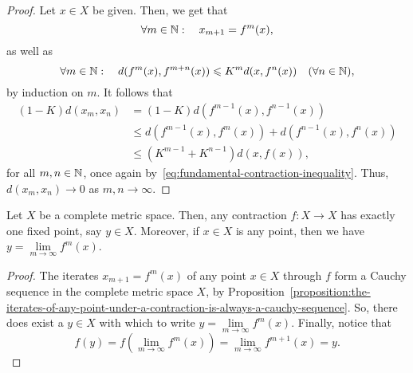 \begin{proof}
  Let \(x\in{X}\) be given. Then, we get that
  \[
    \forall{m}\in\mathbb{N}:
    \quad{x_{m+1}=f^{m}(x)},
  \]
  as well as
  \[
    \forall{m}\in\mathbb{N}:
    \quad{d(f^{m}(x),f^{m+n}(x))\leqslant{K^{m}}d(x,f^{n}(x))}
    \quad{(\forall{n}\in\mathbb{N})},
  \]
  by induction on \(m\). It follows that
  \begin{equation}
    \begin{split}
      (1-K)d(x_{m},x_{n})
      &=
      (1-K)d(f^{m-1}(x),f^{n-1}(x))
      \\
      &\leqslant{d(f^{m-1}(x),f^{m}(x))+d(f^{n-1}(x),f^{n}(x))}
      \\
      &\leqslant{\left(K^{m-1}+K^{n-1}\right)d(x,f(x))},
    \end{split}
  \end{equation}
  for all \(m,n\in\mathbb{N}\), once again
  by~\eqref{eq:fundamental-contraction-inequality}. Thus,
  \(d(x_{m},x_{n})\to{0}\) as \(m,n\to\infty\).
\end{proof}

\begin{corollary}\label{corollary:banachs-contraction-principle}
  Let \(X\) be a complete metric space. Then, any contraction \(f:X\to{X}\) has
  exactly one fixed point, say \(y\in{X}\). Moreover, if \(x\in{X}\) is any
  point, then we have \(y=\lim\limits_{m\to\infty}f^{m}(x)\).
\end{corollary}

\begin{proof}
  The iterates \(x_{m+1}=f^{m}(x)\) of any point \(x\in{X}\) through \(f\) form
  a Cauchy sequence in the complete metric space \(X\), by
  Proposition~\ref{proposition:the-iterates-of-any-point-under-a-contraction-is-always-a-cauchy-sequence}.
  So, there does exist a \(y\in{X}\) with which to write
  \(y=\lim\limits_{m\to\infty}f^{m}(x)\). Finally, notice that
  \[
    f(y)=f\left(\lim\limits_{m\to\infty}f^{m}(x)\right)=\lim\limits_{m\to\infty}f^{m+1}(x)=y.
  \]
\end{proof}
